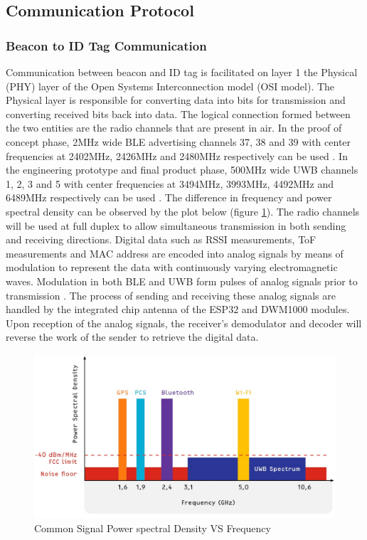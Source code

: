 \pagebreak
\subsection{Communication Protocol}
\subsubsection{Beacon to ID Tag Communication}
\medskip
Communication between beacon and ID tag is facilitated on layer 1 the Physical (PHY) layer of the Open Systems Interconnection model (\Gls{OSI} model). The Physical layer is responsible for converting data into bits for transmission and converting received bits back into data. The logical connection formed between the two entities are the radio channels that are present in air. In the proof of concept phase, 2MHz wide BLE advertising channels 37, 38 and 39 with center frequencies at 2402MHz, 2426MHz and 2480MHz respectively can be used \cite{R4-2-3}. In the engineering prototype and final product phase, 500MHz wide UWB channels 1, 2, 3 and 5 with center frequencies at 3494MHz, 3993MHz, 4492MHz and 6489MHz respectively can be used \cite{R4-2-2}. The difference in frequency and power spectral density can be observed by the plot below (figure \ref{spectrum}). The radio channels will be used at full duplex to allow simultaneous transmission in both sending and receiving directions. Digital data such as RSSI measurements, ToF measurements and MAC address are encoded into analog signals by means of modulation to represent the data with continuously varying electromagnetic waves. Modulation in both BLE and UWB form pulses of analog signals prior to transmission \cite{R4-2-3}. The process of sending and receiving these analog signals are handled by the integrated chip antenna of the ESP32 and DWM1000 modules. Upon reception of the analog signals, the receiver's demodulator and decoder will reverse the work of the sender to retrieve the digital data. 

\bigskip
\begin{figure}[H]
\centering
    \includegraphics[width=\linewidth]{./images/spectrum.jpg}
    \caption{Common Signal Power spectral Density VS Frequency}
    \label{spectrum}
\end{figure}

